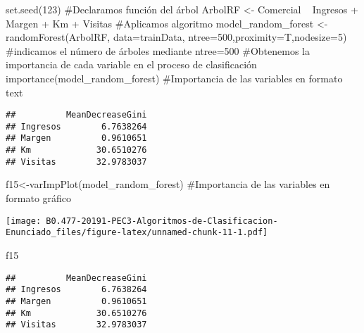 \documentclass[]{article}
\newenvironment{Shaded}{\begin{snugshade}}{\end{snugshade}}
\newcommand{\KeywordTok}[1]{\textcolor[rgb]{0.94,0.87,0.69}{#1}}
\newcommand{\DataTypeTok}[1]{\textcolor[rgb]{0.87,0.87,0.75}{#1}}
\newcommand{\DecValTok}[1]{\textcolor[rgb]{0.86,0.86,0.80}{#1}}
\newcommand{\StringTok}[1]{\textcolor[rgb]{0.80,0.58,0.58}{#1}}
\newcommand{\CommentTok}[1]{\textcolor[rgb]{0.50,0.62,0.50}{#1}}
\newcommand{\OperatorTok}[1]{\textcolor[rgb]{0.94,0.94,0.82}{#1}}
\newcommand{\NormalTok}[1]{\textcolor[rgb]{0.80,0.80,0.80}{#1}}
\begin{document}
\begin{Shaded}
\begin{Highlighting}[]
\KeywordTok{set.seed}\NormalTok{(}\DecValTok{123}\NormalTok{)}
\CommentTok{#Declaramos función del árbol}
\NormalTok{ArbolRF <-}\StringTok{ }\NormalTok{Comercial }\OperatorTok{~}\StringTok{ }\NormalTok{Ingresos }\OperatorTok{+}\StringTok{ }\NormalTok{Margen }\OperatorTok{+}\StringTok{ }\NormalTok{Km }\OperatorTok{+}\StringTok{ }\NormalTok{Visitas}
\CommentTok{#Aplicamos algoritmo}
\NormalTok{model_random_forest <-}\StringTok{ }\KeywordTok{randomForest}\NormalTok{(ArbolRF, }\DataTypeTok{data=}\NormalTok{trainData, }\DataTypeTok{ntree=}\DecValTok{500}\NormalTok{,}\DataTypeTok{proximity=}\NormalTok{T,}\DataTypeTok{nodesize=}\DecValTok{5}\NormalTok{) }\CommentTok{#indicamos el número de árboles mediante ntree=500}
\CommentTok{#Obtenemos la importancia de cada variable en el proceso de clasificación}
\KeywordTok{importance}\NormalTok{(model_random_forest)      }\CommentTok{#Importancia de las variables en formato text}
\end{Highlighting}
\end{Shaded}

\begin{verbatim}
##          MeanDecreaseGini
## Ingresos        6.7638264
## Margen          0.9610651
## Km             30.6510276
## Visitas        32.9783037
\end{verbatim}

\begin{Shaded}
\begin{Highlighting}[]
\NormalTok{f15<-}\KeywordTok{varImpPlot}\NormalTok{(model_random_forest) }\CommentTok{#Importancia de las variables en formato gráfico}
\end{Highlighting}
\end{Shaded}

\texttt{[image: B0.477-20191-PEC3-Algoritmos-de-Clasificacion-Enunciado\_files/figure-latex/unnamed-chunk-11-1.pdf]}

\begin{Shaded}
\begin{Highlighting}[]
\NormalTok{f15}
\end{Highlighting}
\end{Shaded}

\begin{verbatim}
##          MeanDecreaseGini
## Ingresos        6.7638264
## Margen          0.9610651
## Km             30.6510276
## Visitas        32.9783037
\end{verbatim}
\end{document}
